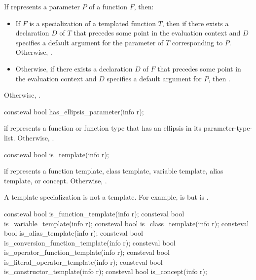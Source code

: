 \begin{itemdescr}
\pnum
\returns
If  represents a parameter $P$ of a function $F$, then:
\begin{itemize}
\item
  If $F$ is a specialization of a templated function $T$,
  then  if there exists a declaration $D$ of $T$
  that precedes some point in the evaluation context
  and $D$ specifies a default argument
  for the parameter of $T$ corresponding to $P$.
  Otherwise, .
\item
  Otherwise, if there exists a declaration $D$ of $F$
  that precedes some point in the evaluation context
  and $D$ specifies a default argument for $P$,
  then .
\end{itemize}
Otherwise, .
\end{itemdescr}

%
\begin{itemdecl}
consteval bool has_ellipsis_parameter(info r);
\end{itemdecl}

\begin{itemdescr}
\pnum
\returns
{} if  represents a function or function type
that has an ellipsis in its parameter-type-list.
Otherwise, .
\end{itemdescr}

%
\begin{itemdecl}
consteval bool is_template(info r);
\end{itemdecl}

\begin{itemdescr}
\pnum
\returns
{} if  represents a
function template,
class template,
variable template,
alias template, or
concept.
Otherwise, .

\pnum
\begin{note}
A template specialization is not a template.
For example,
 is 
but  is .
\end{note}
\end{itemdescr}

%
%
%
%
%
%
%
%
%
\begin{itemdecl}
consteval bool is_function_template(info r);
consteval bool is_variable_template(info r);
consteval bool is_class_template(info r);
consteval bool is_alias_template(info r);
consteval bool is_conversion_function_template(info r);
consteval bool is_operator_function_template(info r);
consteval bool is_literal_operator_template(info r);
consteval bool is_constructor_template(info r);
consteval bool is_concept(info r);
\end{itemdecl}

